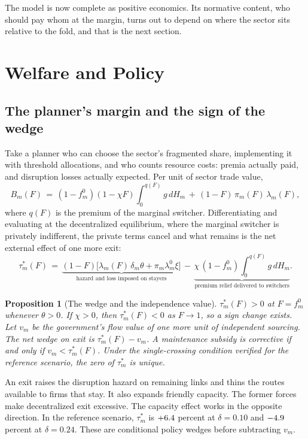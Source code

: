 \documentclass[11pt]{article}
\newtheorem{proposition}{Proposition}
\theoremstyle{definition}
\begin{document}
The model is now complete as positive economics. Its normative content, who should pay whom at the margin, turns out to depend on where the sector sits relative to the fold, and that is the next section.

\section{Welfare and Policy}\label{sec:policy}

\subsection{The planner's margin and the sign of the wedge}

Take a planner who can choose the sector's fragmented share, implementing it with threshold allocations, and who counts resource costs: premia actually paid, and disruption losses actually expected. Per unit of sector trade value,
\begin{equation}
B_m(F) \,=\, (1 - f^0_m)(1 - \chi F)\!\int_0^{q(F)}\! g\, dH_m \,+\, (1 - F)\,\pi_m(F)\,\lambda_m(F),
\label{eq:burden}
\end{equation}
where $q(F)$ is the premium of the marginal switcher. Differentiating and evaluating at the decentralized equilibrium, where the marginal switcher is privately indifferent, the private terms cancel and what remains is the net external effect of one more exit:
\begin{equation}
\tau^*_m(F) \,=\, \underbrace{(1 - F)\big[\lambda_m(F)\,\delta_m\theta + \pi_m \lambda^0_m \xi\big]}_{\text{hazard and loss imposed on stayers}} \,-\, \underbrace{\chi\,(1 - f^0_m)\!\int_0^{q(F)}\! g\, dH_m}_{\text{premium relief delivered to switchers}} .
\label{eq:wedge}
\end{equation}

\begin{proposition}[The wedge and the independence value]\label{prop:wedge}
$\tau^*_m(F)>0$ at $F=f_m^0$ whenever $\theta>0$. If $\chi>0$, then $\tau^*_m(F)<0$ as $F\to1$, so a sign change exists. Let $v_m$ be the government's flow value of one more unit of independent sourcing. The net wedge on exit is $\tau_m^*(F)-v_m$. A maintenance subsidy is corrective if and only if $v_m<\tau_m^*(F)$. Under the single-crossing condition verified for the reference scenario, the zero of $\tau_m^*$ is unique.
\end{proposition}

An exit raises the disruption hazard on remaining links and thins the routes available to firms that stay. It also expands friendly capacity. The former forces make decentralized exit excessive. The capacity effect works in the opposite direction. In the reference scenario, $\tau_m^*$ is $+6.4$ percent at $\delta=0.10$ and $-4.9$ percent at $\delta=0.24$. These are conditional policy wedges before subtracting $v_m$.
\end{document}

